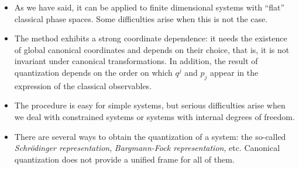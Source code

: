 \documentclass[12pt]{article}
\theoremstyle{plain}
\begin{document}
\begin{itemize}
\item
As we have said, it can be applied to finite dimensional systems
with ``flat'' classical phase spaces. Some difficulties arise when this
is not the case.
\item
The method exhibits a strong coordinate dependence:
it needs the existence of global canonical coordinates and depends on
their choice,
that is, it is not invariant under canonical transformations.
In addition, the result of quantization depends on the
order on which $q^j$ and $p_j$ appear in the expression of the classical
observables.
\item
The procedure is easy for simple systems, but serious difficulties arise
when we deal with
constrained systems or systems with internal degrees of freedom.
\item
There are several ways to obtain the quantization of a system: the
so-called
{\it Schr\"odinger representation}, {\it Bargmann-Fock representation},
etc. Canonical quantization does not provide a unified frame for all of
them.
\end{itemize}
\end{document}
